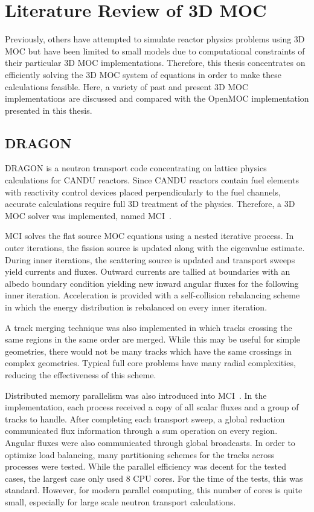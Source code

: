 \section{Literature Review of 3D MOC}
\label{sec:lit-review}

Previously, others have attempted to simulate reactor physics problems using 3D \ac{MOC} but have been limited to small models due to computational constraints of their particular 3D \ac{MOC} implementations. Therefore, this thesis concentrates on efficiently solving the 3D \ac{MOC} system of equations in order to make these calculations feasible. Here, a variety of past and present 3D \ac{MOC} implementations are discussed and compared with the OpenMOC implementation presented in this thesis.

\subsection{DRAGON}
\label{sec:dragon}
DRAGON is a neutron transport code concentrating on lattice physics calculations for CANDU reactors. Since CANDU reactors contain fuel elements with reactivity control devices placed perpendicularly to the fuel channels, accurate calculations require full 3D treatment of the physics. Therefore, a 3D \ac{MOC} solver was implemented, named MCI~\cite{dragon_3d_moc}. 

MCI solves the flat source \ac{MOC} equations using a nested iterative process. In outer iterations, the fission source is updated along with the eigenvalue estimate. During inner iterations, the scattering source is updated and transport sweeps yield currents and fluxes. Outward currents are tallied at boundaries with an albedo boundary condition yielding new inward angular fluxes for the following inner iteration. Acceleration is provided with a self-collision rebalancing scheme in which the energy distribution is rebalanced on every inner iteration.

A track merging technique was also implemented in which tracks crossing the same regions in the same order are merged. While this may be useful for simple geometries, there would not be many tracks which have the same crossings in complex geometries. Typical full core problems have many radial complexities, reducing the effectiveness of this scheme.

Distributed memory parallelism was also introduced into MCI~\cite{dragon_parallel}. In the implementation, each process received a copy of all scalar fluxes and a group of tracks to handle. After completing each transport sweep, a global reduction communicated flux information through a sum operation on every region. Angular fluxes were also communicated through global broadcasts. In order to optimize load balancing, many partitioning schemes for the tracks across processes were tested. While the parallel efficiency was decent for the tested cases, the largest case only used 8 CPU cores. For the time of the tests, this was standard. However, for modern parallel computing, this number of cores is quite small, especially for large scale neutron transport calculations.

